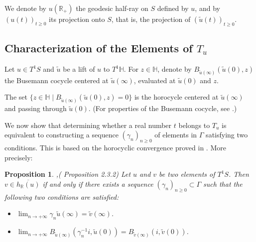 \documentclass[11pt]{amsart}
\newtheorem{prp}{Proposition}
\begin{document}
We denote by \( u(\mathbb{R}_{+}) \) the geodesic half-ray on \( S \) defined by \( u \), and by \( (u(t))_{t \geq 0} \) its projection onto \( S \), that is, the projection of \( (\widetilde{u}(t))_{t \geq 0} \).
\subsection{Characterization of the Elements of $T_{u}$}

Let \( u \in T^1S \) and \( \widetilde{u} \) be a lift of \( u \) to \( T^1\mathbb{H} \). For \( z \in \mathbb{H} \), denote by \( B_{\widetilde{u}(\infty)}(\widetilde{u}(0), z) \) the Busemann cocycle centered at \( \widetilde{u}(\infty) \), evaluated at \( \widetilde{u}(0) \) and \( z \).  

The set \( \{ z \in \mathbb{H} \mid B_{\widetilde{u}(\infty)}(\widetilde{u}(0), z) = 0 \} \) is the horocycle centered at \( \widetilde{u}(\infty) \) and passing through \( \widetilde{u}(0) \).  
(For properties of the Busemann cocycle, see \cite{Dalbo2007}.)

We now show that determining whether a real number \( t \) belongs to \( T_u \) is equivalent to constructing a sequence \( (\gamma_n)_{n \geq 0} \) of elements in \( \Gamma \) satisfying two conditions.  
This is based on the horocyclic convergence proved in \cite{BellisThesis}.
\newpage
More precisely:

\begin{prp}\cite{BellisThesis},( Proposition 2.3.2)
Let \( u \) and \( v \) be two elements of \( T^1S \). Then \( v \in \overline{h_{\mathbb{R}}(u)} \) if and only if there exists a sequence \( (\gamma_n)_{n \geq 0} \subset \Gamma \) such that the following two conditions are satisfied:
\begin{itemize}
    \item[\textnormal{(i)}] \( \displaystyle\lim_{n \to +\infty} \gamma_n \widetilde{u}(\infty) = \widetilde{v}(\infty) \).

    \item[\textnormal{(ii)}] \( \displaystyle\lim_{n \to +\infty} B_{\widetilde{u}(\infty)}(\gamma_n^{-1}i, \widetilde{u}(0)) = B_{\widetilde{v}(\infty)}(i, \widetilde{v}(0)) \).
\end{itemize}

\end{prp}
\end{document}

